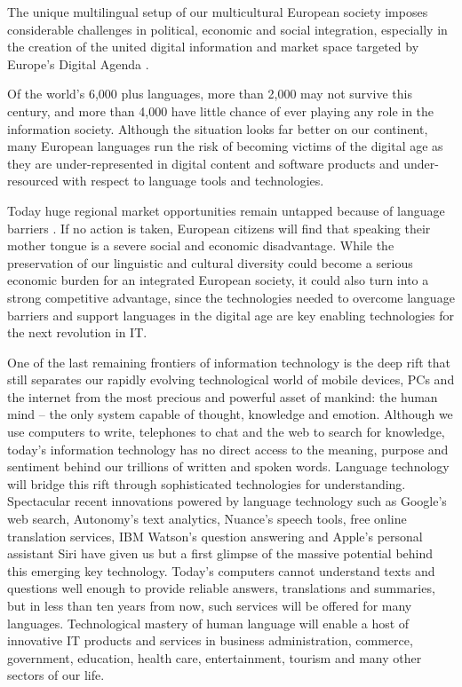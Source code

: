 \documentclass[10pt, plain]{../../metanetpaper}
\begin{document}
\begin{multicols}{2}
The unique multilingual setup of our multicultural European society imposes considerable challenges in political, economic and social integration, especially in the creation of the united digital information and market space targeted by Europe’s Digital Agenda \cite{DA2010}.

Of the world’s 6,000 plus languages, more than 2,000 may not survive this century, and more than 4,000 have little chance of ever playing any role in the information society. Although the situation looks far better on our continent, many European languages run the risk of becoming victims of the digital age as they are under-represented in digital content and software products and under-resourced with respect to language tools and technologies.

Today huge regional market opportunities remain untapped because of language barriers \cite{EC3, EC6}. If no action is taken, European citizens will find that speaking their mother tongue is a severe social and economic disadvantage. While the preservation of our linguistic and cultural diversity could become a serious economic burden for an integrated European society, it could also turn into a strong competitive advantage, since the technologies needed to overcome language barriers and support languages in the digital age are key enabling technologies for the next revolution in IT. 

One of the last remaining frontiers of information technology is the deep rift that still separates our rapidly evolving technological world of mobile devices, PCs and the internet from the most precious and powerful asset of mankind: the human mind -- the only system capable of thought, knowledge and emotion. Although we use computers to write, telephones to chat and the web to search for knowledge, today’s information technology has no direct access to the meaning, purpose and sentiment behind our trillions of written and spoken words. Language technology will bridge this rift through sophisticated technologies for understanding. 
Spectacular recent innovations powered by language technology such as Google’s web search, Autonomy’s text analytics, Nuance’s speech tools, free online translation services, IBM Watson’s question answering and Apple's personal assistant Siri have given us but a first glimpse of the massive potential behind this emerging key technology. Today’s computers cannot understand texts and questions well enough to provide reliable answers, translations and summaries, but in less than ten years from now, such services will be offered for many languages. Technological mastery of human language will enable a host of innovative IT products and services in business administration, commerce, government, education, health care, entertainment, tourism and many other sectors of our life.


\end{multicols}
\end{document}
